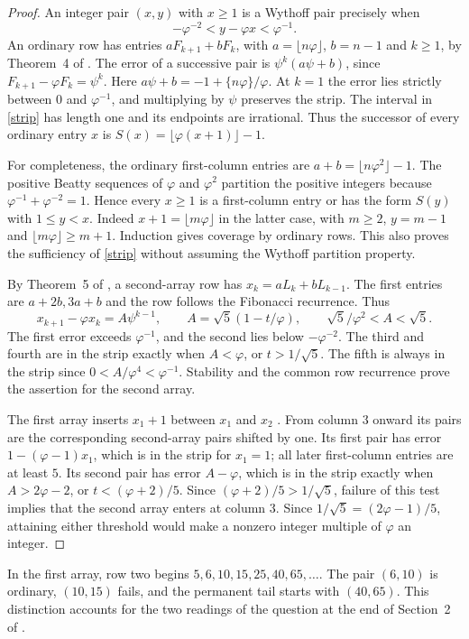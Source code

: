\documentclass[10pt]{article}
\newcommand{\ph}{\varphi}
\newcommand{\fr}[1]{\{#1\}}
\begin{document}
\begin{proof}
An integer pair $(x,y)$ with $x\ge1$ is a Wythoff pair precisely when
\begin{equation}\label{strip}
 -\ph^{-2}<y-\ph x<\ph^{-1}.
\end{equation}
An ordinary row has entries $aF_{k+1}+bF_k$, with $a=\lfloor n\ph\rfloor$, $b=n-1$ and $k\ge1$, by Theorem~4 of \cite{kim}. The error of a successive pair is $\psi^k(a\psi+b)$, since $F_{k+1}-\ph F_k=\psi^k$. Here $a\psi+b=-1+\fr{n\ph}/\ph$. At $k=1$ the error lies strictly between $0$ and $\ph^{-1}$, and multiplying by $\psi$ preserves the strip. The interval in \eqref{strip} has length one and its endpoints are irrational. Thus the successor of every ordinary entry $x$ is $S(x)=\lfloor \ph(x+1)\rfloor-1$.

For completeness, the ordinary first-column entries are $a+b=\lfloor n\ph^2\rfloor-1$. The positive Beatty sequences of $\ph$ and $\ph^2$ partition the positive integers because $\ph^{-1}+\ph^{-2}=1$. Hence every $x\ge1$ is a first-column entry or has the form $S(y)$ with $1\le y<x$. Indeed $x+1=\lfloor m\ph\rfloor$ in the latter case, with $m\ge2$, $y=m-1$ and $\lfloor m\ph\rfloor\ge m+1$. Induction gives coverage by ordinary rows. This also proves the sufficiency of \eqref{strip} without assuming the Wythoff partition property.

By Theorem~5 of \cite{kim}, a second-array row has $x_k=aL_k+bL_{k-1}$. The first entries are $a+2b,3a+b$ and the row follows the Fibonacci recurrence. Thus
\[
 x_{k+1}-\ph x_k=A\psi^{k-1},\qquad
 A=\sqrt5(1-t/\ph),\qquad \sqrt5/\ph^2<A<\sqrt5 .
\]
The first error exceeds $\ph^{-1}$, and the second lies below $-\ph^{-2}$. The third and fourth are in the strip exactly when $A<\ph$, or $t>1/\sqrt5$. The fifth is always in the strip since $0<A/\ph^4<\ph^{-1}$. Stability and the common row recurrence prove the assertion for the second array.

The first array inserts $x_1+1$ between $x_1$ and $x_2$ \cite{kim}. From column $3$ onward its pairs are the corresponding second-array pairs shifted by one. Its first pair has error $1-(\ph-1)x_1$, which is in the strip for $x_1=1$; all later first-column entries are at least $5$. Its second pair has error $A-\ph$, which is in the strip exactly when $A>2\ph-2$, or $t<(\ph+2)/5$. Since $(\ph+2)/5>1/\sqrt5$, failure of this test implies that the second array enters at column $3$. Since $1/\sqrt5=(2\ph-1)/5$, attaining either threshold would make a nonzero integer multiple of $\ph$ an integer.
\end{proof}
In the first array, row two begins $5,6,10,15,25,40,65,\ldots$. The pair $(6,10)$ is ordinary, $(10,15)$ fails, and the permanent tail starts with $(40,65)$. This distinction accounts for the two readings of the question at the end of Section~2 of \cite{kim}.
\end{document}
